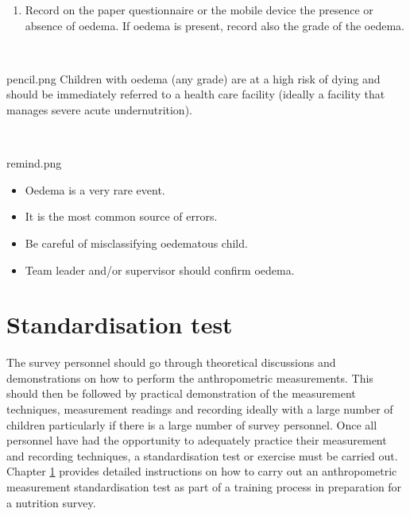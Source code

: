\documentclass[
  12pt,
]{book}
\providecommand{\tightlist}{%
  \setlength{\itemsep}{0pt}\setlength{\parskip}{0pt}}
\newenvironment{rmdremind}
  {\begin{tcolorbox}[width=\textwidth, 
                     colback = {white}, 
                     title = {\textbf{Remember}}, 
                     colbacktitle = lightgray,
                     coltitle = black]
  \begin{includegraphics}[scale = 1]{remind.png}
  \begin{itemize}}
  {\end{itemize}
  \end{includegraphics}
  \end{tcolorbox}}
\newenvironment{rmdnote}
  {\begin{tcolorbox}[width=\textwidth, 
                     colback = {white}, 
                     title = {\textbf{Note}}, 
                     colbacktitle = lightgray,
                     coltitle = black]
  \begin{includegraphics}[scale = 1]{pencil.png}}
  {\end{includegraphics}
  \end{tcolorbox}}
\begin{document}
\begin{enumerate}
\def\labelenumi{\arabic{enumi}.}
\setcounter{enumi}{4}
\tightlist
\item
  Record on the paper questionnaire or the mobile device the presence or absence of oedema. If oedema is present, record also the grade of the oedema.
\end{enumerate}

~

\begin{rmdnote}
Children with oedema (any grade) are at a high risk of dying and should be immediately referred to a health care facility (ideally a facility that manages severe acute undernutrition).
\end{rmdnote}

~

\begin{rmdremind}
\item

Oedema is a very rare event.

\item

It is the most common source of errors.

\item

Be careful of misclassifying oedematous child.

\item

Team leader and/or supervisor should confirm oedema.
\end{rmdremind}

\hypertarget{standard}{%
\chapter{Standardisation test}\label{standard}}

The survey personnel should go through theoretical discussions and demonstrations on how to perform the anthropometric measurements. This should then be followed by practical demonstration of the measurement techniques, measurement readings and recording ideally with a large number of children particularly if there is a large number of survey personnel. Once all personnel have had the opportunity to adequately practice their measurement and recording techniques, a standardisation test or exercise must be carried out. Chapter \ref{standard} provides detailed instructions on how to carry out an anthropometric measurement standardisation test as part of a training process in preparation for a nutrition survey.
\end{document}
